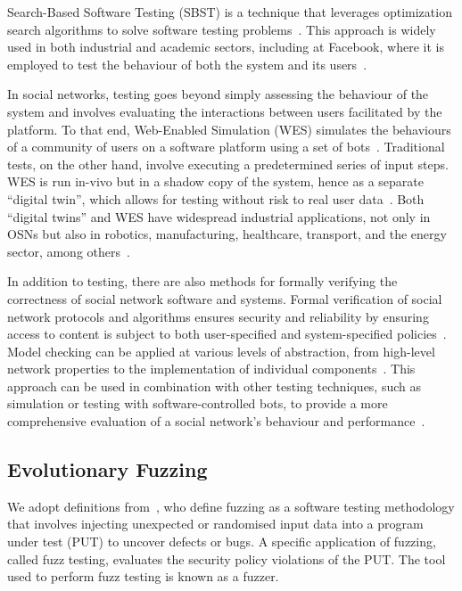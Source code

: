 \documentclass[dvipsnames,format=sigconf,anonymous=False,review=false, balance=false]{acmart}
\begin{document}
Search-Based Software Testing (SBST) is a technique that leverages optimization search algorithms to solve software testing problems~\cite{5954405}. This approach is widely used in both industrial and academic sectors, including at Facebook, where it is employed to test the behaviour of both the system and its users~\cite{10.1007/978-3-319-99241-9_1}.

In social networks, testing goes beyond simply assessing the behaviour of the system and involves evaluating the interactions between users facilitated by the platform. To that end, Web-Enabled Simulation (WES) simulates the behaviours of a community of users on a software platform using a set of bots~\cite{ahlgren2020wes}. Traditional tests, on the other hand, involve executing a predetermined series of input steps. WES is run in-vivo but in a shadow copy of the system, hence as a separate ``digital twin'', which allows for testing without risk to real user data~\cite{ahlgren2021facebook}. Both ``digital twins'' and WES have widespread industrial applications, not only in OSNs but also in robotics, manufacturing, healthcare, transport, and the energy sector, among others~\cite{jiang2021industrial,8972429}.

In addition to testing, there are also methods for formally verifying the correctness of social network software and systems. Formal verification of social network protocols and algorithms ensures security and reliability by ensuring access to content is subject to both user-specified and system-specified policies~\cite{cheng2012user,kafali2014detecting}. Model checking can be applied at various levels of abstraction, from high-level network properties to the implementation of individual components~\cite{pardo2017model}. This approach can be used in combination with other testing techniques, such as simulation or testing with software-controlled bots, to provide a more comprehensive evaluation of a social network's behaviour and performance~\cite{pedersen2021social}.


\subsection{Evolutionary Fuzzing}

We adopt definitions from~\citet{https://doi.org/10.48550/arxiv.1812.00140}, who define fuzzing as a software testing methodology  that involves injecting unexpected or randomised input data into a program under test (PUT) to uncover defects or bugs. A specific application of fuzzing, called fuzz testing, evaluates the security policy violations of the PUT. The tool used to perform fuzz testing is known as a fuzzer.
\end{document}
